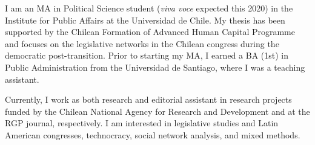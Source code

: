 




\par{I am an MA in Political Science student ({\itshape viva voce} expected this 2020) in the Institute for Public Affairs at the Universidad de Chile. My thesis has been supported by the Chilean Formation of Advanced Human Capital Programme and focuses on the legislative networks in the Chilean congress during the democratic post-transition. Prior to starting my MA, I earned a BA (1st) in Public Administration from the Universidad de Santiago, where I was a teaching assistant.

Currently, I work as both research and editorial assistant in research projects funded by the Chilean National Agency for Research and Development and at the RGP journal, respectively. I am interested in legislative studies and Latin American congresses, technocracy, social network analysis, and mixed methods.}\\